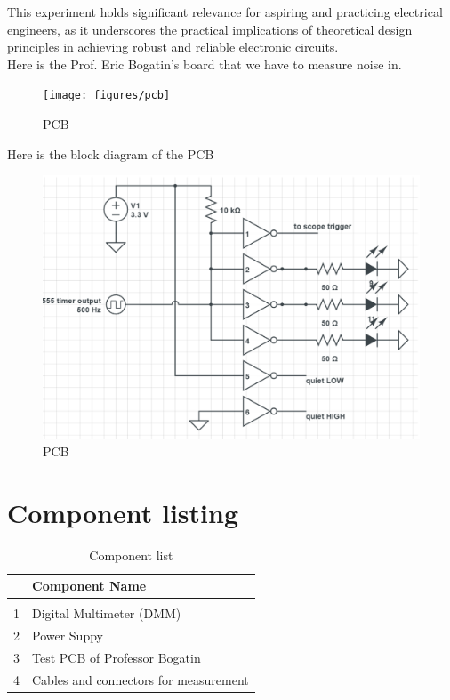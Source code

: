 \documentclass[a4paper,11pt]{article}%
\begin{document}
This experiment holds significant relevance for aspiring and practicing electrical engineers, as it underscores the practical implications of theoretical design principles in achieving robust and reliable electronic circuits.\\

Here is the Prof. Eric Bogatin's board that we have to measure noise in.

\begin{figure}[H]
	\centering
	\texttt{[image: figures/pcb]}
	\caption{PCB}

\end{figure}

Here is the block diagram of the PCB
\begin{figure}[H]
	\centering
	\includegraphics[scale=0.3]{figures/blockdiagram.png}
	\caption{PCB}

\end{figure}
\section{Component listing}


\begin{table}[H]
	\centering
	\begin{tabular}{|c|l|}
		\hline
		  & \textbf{Component Name}               \\\hline
		  &                                       \\
		1 & Digital Multimeter (DMM)              \\
		2 & Power Suppy                           \\
		3 & Test PCB of Professor Bogatin         \\
		4 & Cables and connectors for measurement \\
		\hline\hline
	\end{tabular}
	\caption{Component list}
	\label{filterspecs}
\end{table}
\end{document}
